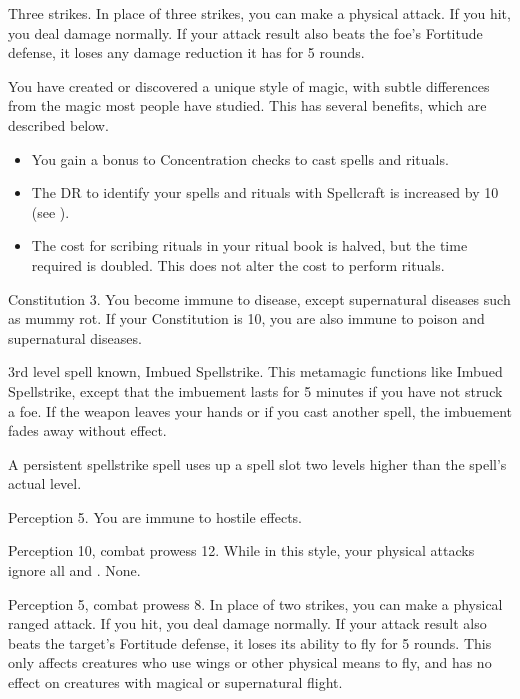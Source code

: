 \featpre Three strikes.
\featben In place of three strikes, you can make a physical attack.
If you hit, you deal damage normally.
If your attack result also beats the foe's Fortitude defense, it loses any damage reduction it has for 5 rounds.

\featben You have created or discovered a unique style of magic, with subtle differences from the magic most people have studied.
This has several benefits, which are described below.
\begin{itemize}
    \item You gain a  bonus to Concentration checks to cast spells and rituals.
    \item The DR to identify your spells and rituals with Spellcraft is increased by 10 (see ).
    \item The cost for scribing rituals in your ritual book is halved, but the time required is doubled.
        This does not alter the cost to perform rituals.
\end{itemize}

\featpre Constitution 3.
\featben You become immune to disease, except supernatural diseases such as mummy rot.
If your Constitution is 10, you are also immune to poison and supernatural diseases.

\featpres 3rd level spell known, Imbued Spellstrike.
\featben This metamagic functions like Imbued Spellstrike, except that the imbuement lasts for 5 minutes if you have not struck a foe.
If the weapon leaves your hands or if you cast another spell, the imbuement fades away without effect.

A persistent spellstrike spell uses up a spell slot two levels higher than the spell's actual level.

\featpre Perception 5.
\featben You are immune to hostile  effects.

\featpres Perception 10, combat prowess 12.
\featben While in this style, your physical attacks ignore all  and .
\stylereq None.

\featpres Perception 5, combat prowess 8.
\featben In place of two strikes, you can make a physical ranged attack.
If you hit, you deal damage normally.
If your attack result also beats the target's Fortitude defense, it loses its ability to fly for 5 rounds.
This only affects creatures who use wings or other physical means to fly, and has no effect on creatures with magical or supernatural flight.

